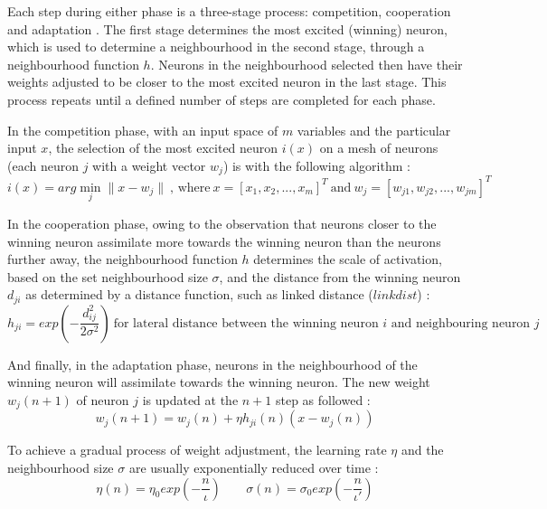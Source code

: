\documentclass[10pt, oneside]{article}
\begin{document}
Each step during either phase is a three-stage process: competition, cooperation and adaptation \cite[pp. 429-430]{haykin2008}. The first stage determines the most excited (winning) neuron, which is used to determine a neighbourhood in the second stage, through a neighbourhood function $h$. Neurons in the neighbourhood selected then have their weights adjusted to be closer to the most excited neuron in the last stage. This process repeats until a defined number of steps are completed for each phase.

In the competition phase, with an input space of $m$ variables and the particular input $x$, the selection of the most excited neuron $i(x)$ on a mesh of neurons (each neuron $j$ with a weight vector $w_j$) is with the following algorithm \cite[p. 430]{haykin2008}:
\begin{equation}
i(x) = arg \min_{j}\|x  - w_{j}\| \ \text{, where}\ x = [x_1, x_2, ..., x_m]^T \ \text{and} \ w_j = [w_{j1}, w_{j2}, ..., w_{jm}]^T
\end{equation}

In the cooperation phase, owing to the observation that neurons closer to the winning neuron assimilate more towards the winning neuron than the neurons further away, the neighbourhood function $h$ determines the scale of activation, based on the set neighbourhood size $\sigma$, and the distance from the winning neuron $d_{ji}$ as determined by a distance function, such as linked distance ($linkdist$) \cite[p. 431]{haykin2008}:
\begin{equation}
h_{ji} = exp(-\frac{d^2_{ij}}{2\sigma^2}) \ \text{for lateral distance between the winning neuron $i$ and neighbouring neuron $j$}
\end{equation}

And finally, in the adaptation phase, neurons in the neighbourhood of the winning neuron will assimilate towards the winning neuron. The new weight $w_j(n+1)$ of neuron $j$ is updated at the $n+1$ step as followed \cite[p. 21]{som-lecture}:
\begin{equation}
w_j(n+1) = w_j(n) + \eta h_{ji}(n)(x-w_j(n))
\end{equation}

To achieve a gradual process of weight adjustment, the learning rate $\eta$ and the neighbourhood size $\sigma$ are usually exponentially reduced over time \cite[pp. 21-22]{som-lecture}:
\begin{equation}
\eta (n) = \eta_0 exp(-\frac{n}{\iota}) \;\;\;\;\;\;\;  \sigma (n) = \sigma_0 exp(-\frac{n}{\iota'})
\end{equation}
\end{document}
